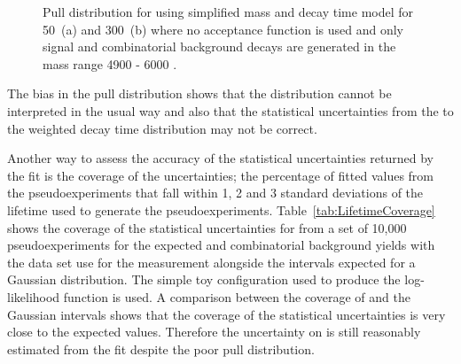 {\begin{figure}[tbp]
\begin{subfigure}[b]{0.48\textwidth}
   \end{subfigure}
    \caption{Pull distribution for \tmumu using simplified mass and decay time model for 50~\fb (a) and 300~\fb (b) where no acceptance function is used and only signal and combinatorial background decays are generated in the mass range 4900 - 6000 \mevcc.}
    \label{fig:morestatstaupulls}
\end{figure}


The bias in the \tmumu pull distribution shows that the distribution cannot be interpreted in the usual way and also that the statistical uncertainties from the \ml to the weighted decay time distribution may not be correct. 

Another way to assess the accuracy of the statistical uncertainties returned by the fit is the coverage of the uncertainties; the percentage of fitted \tmumu values from the pseudoexperiments that fall within 1, 2 and 3 standard deviations of the lifetime used to generate the pseudoexperiments. Table~\ref{tab:LifetimeCoverage} shows the coverage of the statistical uncertainties for \tmumu from a set of 10,000 pseudoexperiments for the expected \bsmumu and combinatorial background yields with the data set use for the \el measurement alongside the intervals expected for a Gaussian distribution. The simple toy configuration used to produce the log-likelihood function is used. A comparison between the coverage of \tmumu and the Gaussian intervals shows that the coverage of the statistical uncertainties is very close to the expected values. Therefore the uncertainty on \tmumu is still reasonably estimated from the fit despite the poor pull distribution.

}
